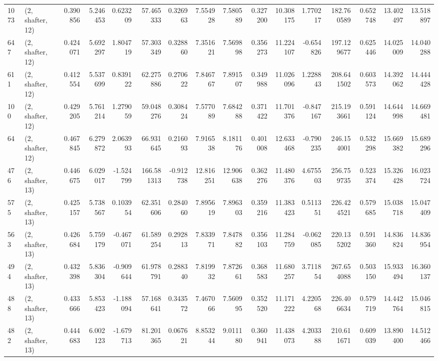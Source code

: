 \begin{tabular}{llrrrrrrrrrrrrrr}
1073 &  (2, shafter, 12) &   0.390856 &   5.246453 &   0.623209 &     57.465333 &    0.326963 &    7.554928 &    7.580589 &  0.327200 &  10.308175 &   1.770217 &   182.760589 &   0.652748 &  13.402497 &  13.518897 \\
647  &  (2, shafter, 12) &   0.424071 &   5.692297 &   1.804719 &     57.303349 &    0.328860 &    7.351621 &    7.569898 &  0.356273 &  11.224107 &  -0.654826 &   197.129677 &   0.625446 &  14.025009 &  14.040288 \\
611  &  (2, shafter, 12) &   0.412554 &   5.537699 &   0.839122 &     62.275886 &    0.270622 &    7.846767 &    7.891507 &  0.349988 &  11.026096 &   1.228843 &   208.641502 &   0.603573 &  14.392062 &  14.444428 \\
100  &  (2, shafter, 12) &   0.429205 &   5.761214 &   1.279059 &     59.048276 &    0.308424 &    7.577089 &    7.684288 &  0.371422 &  11.701376 &  -0.847167 &   215.193661 &   0.591124 &  14.644998 &  14.669481 \\
64   &  (2, shafter, 12) &   0.467845 &   6.279872 &   2.063993 &     66.931645 &    0.216093 &    7.916538 &    8.181176 &  0.401008 &  12.633468 &  -0.790235 &   246.154001 &   0.532298 &  15.669382 &  15.689296 \\
476  &  (2, shafter, 13) &   0.446675 &   6.029017 &  -1.524799 &    166.581313 &   -0.912738 &   12.816251 &   12.906638 &  0.362276 &  11.480376 &   4.675503 &   256.759735 &   0.523374 &  15.326428 &  16.023724 \\
575  &  (2, shafter, 13) &   0.425157 &   5.738567 &   0.103954 &     62.351606 &    0.284060 &    7.895619 &    7.896303 &  0.359216 &  11.383423 &   0.511351 &   226.424521 &   0.579685 &  15.038718 &  15.047409 \\
563  &  (2, shafter, 13) &   0.426684 &   5.759179 &  -0.467071 &     61.589254 &    0.292813 &    7.833971 &    7.847882 &  0.356103 &  11.284759 &  -0.062085 &   220.135202 &   0.591360 &  14.836824 &  14.836954 \\
494  &  (2, shafter, 13) &   0.432398 &   5.836304 &  -0.909644 &     61.978791 &    0.288340 &    7.819932 &    7.872661 &  0.368583 &  11.680257 &   3.711854 &   267.654088 &   0.503150 &  15.933494 &  16.360137 \\
488  &  (2, shafter, 13) &   0.433666 &   5.853423 &  -1.188094 &     57.168641 &    0.343572 &    7.467066 &    7.560995 &  0.352520 &  11.171222 &   4.220568 &   226.406634 &   0.579719 &  14.442764 &  15.046815 \\
482  &  (2, shafter, 13) &   0.444683 &   6.002123 &  -1.679713 &     81.201365 &    0.067621 &    8.853244 &    9.011180 &  0.360941 &  11.438073 &   4.203388 &   210.611671 &   0.609039 &  13.890400 &  14.512466 \\

\end{tabular}
